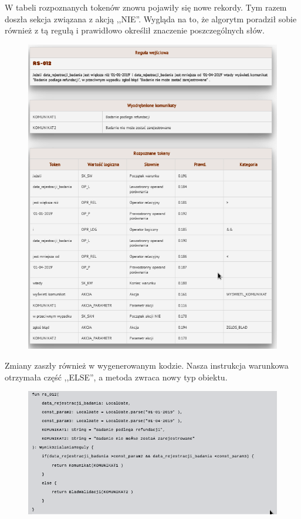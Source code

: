 W tabeli rozpoznanych tokenów znowu pojawiły się nowe rekordy. Tym razem doszła sekcja związana z akcją ,,NIE''. Wygląda na to, że algorytm poradził sobie również z tą regułą i prawidłowo określił znaczenie poszczególnych słów.

\begin{figure}[H]
	\centering
	\includegraphics[scale=0.8]{img/app-eksperymenty/p3-2.png}
\end{figure}
Zmiany zaszły również w wygenerowanym kodzie. Nasza instrukcja warunkowa otrzymała część ,,ELSE'', a metoda zwraca nowy typ obiektu.
\begin{figure}[H]
	\centering
	\includegraphics[scale=0.8]{img/app-eksperymenty/p3-3.png}
\end{figure}

